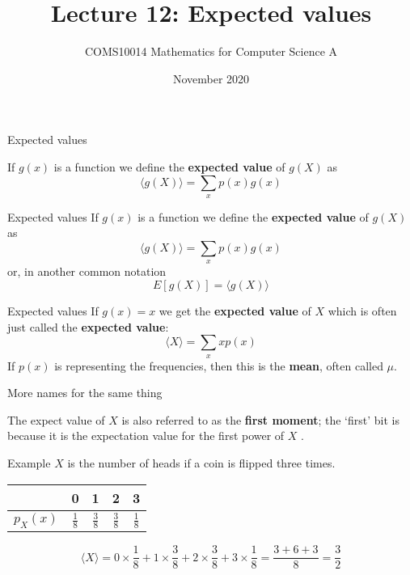 \documentclass{beamer}
\title{Lecture 12: Expected values}
\author{COMS10014 Mathematics for Computer Science A}
\institute{\texttt{cs-uob.github.io/COMS10014/ and github.com/coms10011/2020\_21}}
\date{November 2020}
\newcommand{\crish}{\color{reddish}}
\newcommand{\cbla}{\color{black}}
\begin{document}
\maketitle

\begin{frame}{Expected values}

If \crish$g(x)$\cbla{} 
is a function we define the \textbf{expected value} of \crish$g(X)$\cbla{}  as
\crish$$
\langle g(X)\rangle = \sum_x p(x)g(x)
$$\cbla{}

\end{frame}


\begin{frame}{Expected values}
If \crish$g(x)$\cbla{} 
is a function we define the \textbf{expected value} of \crish$g(X)$\cbla{}  as
\crish$$
\langle g(X)\rangle = \sum_x p(x)g(x)
$$\cbla{}
or, in another common notation
\crish$$
E[g(X)]=\langle g(X)\rangle
$$\cbla{}
\end{frame}


\begin{frame}{Expected values}
If \crish$g(x)=x$\cbla{} we get the \textbf{expected value} of \crish$X$\cbla{} which is often just called the \textbf{expected value}:
\crish$$
\langle X\rangle = \sum_x xp(x)
$$\cbla{} If \crish$p(x)$\cbla{} is representing the frequencies, then
this is the \textbf{mean}, often called \crish$\mu$\cbla{}.
\end{frame}

\begin{frame}{More names for the same thing}
  
The expect value of \crish$X$\cbla{}  is also referred to as the \textbf{first
  moment}; the \lq{}first\rq{} bit is because it is the expectation
value for the first power of \crish$X$\cbla{} .

\end{frame}

\begin{frame}{Example}
  \crish$X$\cbla{}  is the number of heads if a coin is flipped three times.
  \color{purple}
  \begin{center}
\begin{tabular}{c|cccc}
&0&1&2&3\\
  \hline
  \rule{0pt}{3ex}
$p_X(x)$&$\frac{1}{8}$&$\frac{3}{8}$&$\frac{3}{8}$&$\frac{1}{8}$
\end{tabular}
\end{center}
\cbla{}
\crish$$
\langle X\rangle =0\times\frac{1}{8}+1\times\frac{3}{8}+2\times\frac{3}{8}+3\times \frac{1}{8}=\frac{3+6+3}{8}=\frac{3}{2}
$$\cbla{}
\end{frame}
  
\end{document}
